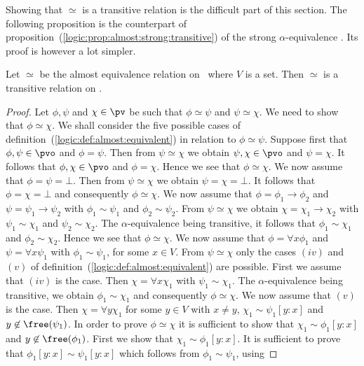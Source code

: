 Showing that $\simeq$ is a transitive relation is the difficult part
of this section. The following proposition is the counterpart of
proposition~(\ref{logic:prop:almost:strong:transitive}) of the
strong $\alpha$-equivalence . Its proof is however a lot simpler.

\begin{prop}\label{logic:prop:almost:transitive}
Let $\simeq$ be the almost equivalence relation on \pv\ where $V$ is
a set. Then $\simeq$ is a transitive relation on \pv.
\end{prop}

\noindent
\begin{proof}
Let $\phi,\psi$ and $\chi\in\pv$ be such that $\phi\simeq\psi$ and
$\psi\simeq\chi$. We need to show that $\phi\simeq\chi$. We shall
consider the five possible cases of
definition~(\ref{logic:def:almost:equivalent}) in relation to
$\phi\simeq\psi$. Suppose first that $\phi,\psi\in\pvo$ and
$\phi=\psi$. Then from $\psi\simeq\chi$ we obtain $\psi,\chi\in\pvo$
and $\psi=\chi$. It follows that $\phi,\chi\in\pvo$ and $\phi=\chi$.
Hence we see that $\phi\simeq\chi$. We now assume that
$\phi=\psi=\bot$. Then from $\psi\simeq\chi$ we obtain
$\psi=\chi=\bot$. It follows that $\phi=\chi=\bot$ and consequently
$\phi\simeq\chi$. We now assume that $\phi=\phi_{1}\to\phi_{2}$ and
$\psi=\psi_{1}\to\psi_{2}$ with $\phi_{1}\sim\psi_{1}$ and
$\phi_{2}\sim\psi_{2}$. From $\psi\simeq\chi$ we obtain
$\chi=\chi_{1}\to\chi_{2}$ with $\psi_{1}\sim\chi_{1}$ and
$\psi_{2}\sim\chi_{2}$. The $\alpha$-equivalence being
transitive, it follows that $\phi_{1}\sim\chi_{1}$ and
$\phi_{2}\sim\chi_{2}$. Hence we see that $\phi\simeq\chi$. We now
assume that $\phi=\forall x\phi_{1}$ and $\psi=\forall x\psi_{1}$
with $\phi_{1}\sim\psi_{1}$, for some $x\in V$. From
$\psi\simeq\chi$ only the cases $(iv)$ and $(v)$ of
definition~(\ref{logic:def:almost:equivalent}) are possible. First
we assume that $(iv)$ is the case. Then $\chi=\forall x\chi_{1}$
with $\psi_{1}\sim\chi_{1}$. The $\alpha$-equivalence being
transitive, we obtain $\phi_{1}\sim\chi_{1}$ and consequently
$\phi\simeq\chi$. We now assume that $(v)$ is the case. Then
$\chi=\forall y\chi_{1}$ for some $y\in V$ with $x\neq y$,
$\chi_{1}\sim\psi_{1}[y\!:\!x]$ and $y\not\in\free(\psi_{1})$. In
order to prove $\phi\simeq\chi$ it is sufficient to show that
$\chi_{1}\sim\phi_{1}[y\!:\!x]$ and $y\not\in\free(\phi_{1})$. First
we show that $\chi_{1}\sim\phi_{1}[y\!:\!x]$. It is sufficient to
prove that $\phi_{1}[y\!:\!x]\sim\psi_{1}[y\!:\!x]$ which follows
from $\phi_{1}\sim\psi_{1}$, using

\end{proof}
